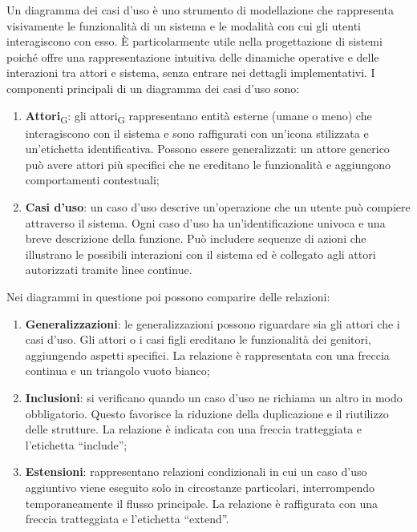 Un diagramma dei casi d’uso è uno strumento di modellazione che rappresenta visivamente le funzionalità di un sistema e le modalità con cui gli utenti interagiscono con esso. È particolarmente utile nella progettazione di sistemi poiché offre una rappresentazione intuitiva delle dinamiche operative e delle interazioni tra attori e sistema, senza entrare nei dettagli implementativi.
I componenti principali di un diagramma dei casi d'uso sono: 
\begin{enumerate}
    \item \textbf{Attori}\textsubscript{G}: gli attori\textsubscript{G} rappresentano entità esterne (umane o meno) che interagiscono con il sistema e sono raffigurati con un’icona stilizzata e un’etichetta identificativa. Possono essere generalizzati: un attore generico può avere attori più specifici che ne ereditano le funzionalità e aggiungono comportamenti contestuali;
    \item \textbf{Casi d'uso}: un caso d’uso descrive un'operazione che un utente può compiere attraverso il sistema. Ogni caso d’uso ha un'identificazione univoca e una breve descrizione della funzione. Può includere sequenze di azioni che illustrano le possibili interazioni con il sistema ed è collegato agli attori autorizzati tramite linee continue.
\end{enumerate}
Nei diagrammi in questione poi possono comparire delle relazioni:
\begin{enumerate}
    \item \textbf{Generalizzazioni}: le generalizzazioni possono riguardare sia gli attori che i casi d’uso. Gli attori o i casi figli ereditano le funzionalità dei genitori, aggiungendo aspetti specifici. La relazione è rappresentata con una freccia continua e un triangolo vuoto bianco;
    \item \textbf{Inclusioni}: si verificano quando un caso d’uso ne richiama un altro in modo obbligatorio. Questo favorisce la riduzione della duplicazione e il riutilizzo delle strutture. La relazione è indicata con una freccia tratteggiata e l’etichetta “include”;
    \item \textbf{Estensioni}: rappresentano relazioni condizionali in cui un caso d’uso aggiuntivo viene eseguito solo in circostanze particolari, interrompendo temporaneamente il flusso principale. La relazione è raffigurata con una freccia tratteggiata e l’etichetta “extend”.
\end{enumerate}

